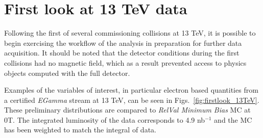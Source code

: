 \clearpage
\section{First look at 13 TeV data\label{app:firstlook13TeV}}

Following the first of several commissioning collisions at 13 TeV, it is possible to begin exercising
the workflow of the analysis in preparation for further data acquisition. 
It should be noted that the detector conditions during the first collisions had no magnetic field, which as a result prevented access to physics objects computed with the full detector.

Examples of the variables of interest, in particular electron based quantities from a certified {\textit{EGamma}} stream at 13 TeV, can be seen in Figs.~\ref{fig:firstlook_13TeV}.
These preliminary distributions are compared to {\textit{RelVal Minimum Bias}} MC at 0T.
The integrated luminosity of the data corresponds to 4.9 nb$^{-1}$ and the MC has been weighted to match the integral of data. 


